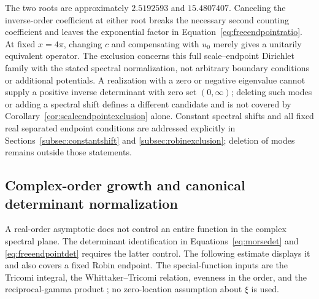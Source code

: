 \documentclass[11pt,letterpaper]{article}
\numberwithin{equation}{section}
\theoremstyle{definition}
\theoremstyle{remark}
\begin{document}
The two roots are approximately $2.5192593$ and $15.4807407$. Canceling the inverse-order coefficient at either root breaks the necessary second counting coefficient and leaves the exponential factor in Equation~\eqref{eq:freeendpointratio}. At fixed $x=4\pi$, changing $c$ and compensating with $u_0$ merely gives a unitarily equivalent operator. The exclusion concerns this full scale--endpoint Dirichlet family with the stated spectral normalization, not arbitrary boundary conditions or additional potentials. A realization with a zero or negative eigenvalue cannot supply a positive inverse determinant with zero set $(0,\infty)$; deleting such modes or adding a spectral shift defines a different candidate and is not covered by Corollary~\ref{cor:scaleendpointexclusion} alone. Constant spectral shifts and all fixed real separated endpoint conditions are addressed explicitly in Sections~\ref{subsec:constantshift} and \ref{subsec:robinexclusion}; deletion of modes remains outside those statements.


\subsection{Complex-order growth and canonical determinant normalization}
\label{subsec:complexwhittaker}
A real-order asymptotic does not control an entire function in the complex spectral plane. The determinant identification in Equations~\eqref{eq:morsedet} and \eqref{eq:freeendpointdet} requires the latter control. The following estimate displays it and also covers a fixed Robin endpoint. The special-function inputs are the Tricomi integral, the Whittaker--Tricomi relation, evenness in the order, and the reciprocal-gamma product \cite[Sections~5.8, 13.4, 13.14, and 13.16]{dlmf}; no zero-location assumption about $\xi$ is used.
\end{document}
